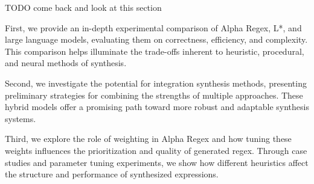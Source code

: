 TODO come back and look at this section

\indent\indent First, we provide an in-depth experimental comparison of Alpha Regex, L*, and large language models, evaluating them on correctness, efficiency, and complexity. This comparison helps illuminate the trade-offs inherent to heuristic, procedural, and neural methods of synthesis.

\indent \indent Second, we investigate the potential for integration synthesis methods, presenting preliminary strategies for combining the strengths of multiple approaches. These hybrid models offer a promising path toward more robust and adaptable synthesis systems.

\indent \indent Third, we explore the role of weighting in Alpha Regex and how tuning these weights influences the prioritization and quality of generated regex. Through case studies and parameter tuning experiments, we show how different heuristics affect the structure and performance of synthesized expressions. 
